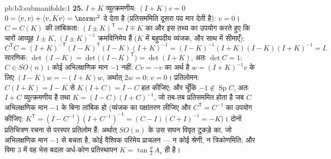 \begin{solution}{pb:b3:submanifolds:1}
\textbf{25.} $I + K$ व्युत्क्रमणीय: $(I + K)v = 0$ $0 =
\langle v, v\rangle + \langle v, Kv\rangle = \norm v^2$ दे देता है (प्रतिसममिति
दूसरा पद मार देती है): $v = 0$। $C = C(K)$ की लांबिकता: $(I \pm K)^{\mathsf T} = I \mp K$ का और इस तथ्य
का उपयोग करते हुए कि चारों आव्यूह $I \pm K$, $(I \pm K)^{-1}$ क्रमविनिमेय हैं ($K$
में बहुपदीय व्यंजक, और साथ में सीमाएँ):
\[
C^{\mathsf T}C = (I + K)^{-\mathsf T}(I - K)^{\mathsf T}
(I - K)(I + K)^{-1}
= (I - K)^{-1}(I + K)(I - K)(I + K)^{-1} = I .
\]
सारणिक: $\det(I - K) = \det\bigl((I - K)^{\mathsf
T}\bigr) = \det(I + K)$, अतः $\det C = 1$: $C \in SO(n)$। कोई अभिलक्षणिक मान $-1$ नहीं: $Cv = -v$
का अर्थ है $w = (I + K)^{-1}v$ के लिए $(I - K)w = -(I + K)w$, अर्थात् $2w = 0$: $v = 0$। प्रतिलोमन: $C(I + K) = I - K$
से $K(I + C) = I -
C$ हल कीजिए; और चूँकि $-1 \notin \operatorname{Sp}C$, अतः $I + C$ व्युत्क्रमणीय है तथा
$K = (I - C)(I + C)^{-1}$, जो तब-तब प्रतिसममित होता है जब $C$ अभिलक्षणिक मान $-1$ के
बिना लांबिक हो (व्यंजक का पक्षांतरण लीजिए और $C^{\mathsf T} =
C^{-1}$ का उपयोग कीजिए:
$K^{\mathsf T} = (I - C^{-1})(I + C^{-1})^{-1} =
(C - I)(C + I)^{-1} = -K$)। दोनों प्रतिचित्रण रचना से परस्पर प्रतिलोम हैं: अर्थात् $SO(n)$
के उस सघन विवृत टुकड़े का, जो अभिलक्षणिक मान $-1$ से बचता है, कोई
वैश्विक परिमेय प्राचलन --- न कोई श्रेणी, न त्रिकोणमिति; और विमा
$3$ में वह भेस बदला अर्ध-कोण प्रतिस्थापन $K = \tan\frac\theta2\,A_v$ ही है।
\end{solution}
